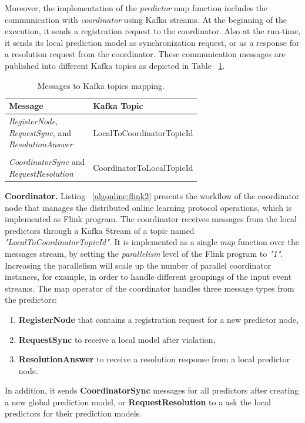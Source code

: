 \par Moreover, the implementation of  the \textit{predictor} map function includes the communication  with \textit{coordinator} using Kafka streams. At the beginning of the execution, it sends a registration request to the coordinator. Also at the run-time,  it sends  its local prediction model as synchronization request,  or as a response for a resolution request from the coordinator. These communication messages are published into different Kafka topics as depicted in Table ~\ref{tab:messagesToTopics}. 
\begin{center}
\centering
\begin{table}[h]
	\caption{Messages to Kafka topics mapping.}
	\label{tab:messagesToTopics}
	\begin{tabular}{p{5cm}l}
		\toprule
		Message &Kafka Topic\\
		\midrule
		\parbox[t]{4cm}{\textit{RegisterNode}, \\ \textit{RequestSync}, and \\\textit{ResolutionAnswer} } &LocalToCoordinatorTopicId\\ \\
		
			  \parbox[t]{4cm}{\textit{CoordinatorSync} and \\ \textit{RequestResolution}} &CoordinatorToLocalTopicId\\
		\bottomrule
	\end{tabular}
\end{table}

\end{center}

\textbf{Coordinator.} Listing ~\ref{algonline:flink2} presents the workflow of the coordinator node that manages the distributed online learning protocol operations, which is implemented as Flink program. The coordinator receives messages from the local predictors through a Kafka Stream of a topic named \textit{"LocalToCoordinatorTopicId"}. It is implemented as a single \textit{map} function over the messages stream, by setting the \textit{parallelism} level of the Flink program to \textit{"1"}. Increasing the parallelism will scale up the number of parallel coordinator instances, for example, in order to handle different groupings of the input event streams. The map operator of the coordinator  handles three message types from the predictors: \begin{enumerate}[]
	\item \textbf{RegisterNode} that contains  a registration request for a new predictor node,
	\item \textbf{RequestSync} to receive a local model after violation,
	\item \textbf{ResolutionAnswer} to receive a resolution response from a local predictor node.  
\end{enumerate}  
 In addition, it sends \textbf{CoordinatorSync} messages for all predictors after creating a new global prediction model, or \textbf{RequestResolution} to a ask the local predictors for their prediction models.
 

